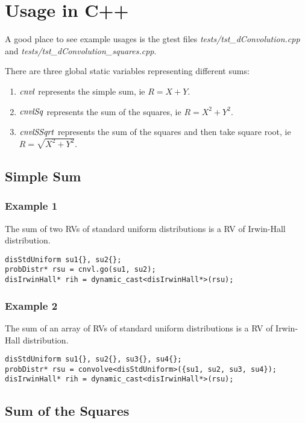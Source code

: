 \section{Usage in C++}

A good place to see example usages is the gtest files \textit{tests/tst\_dConvolution.cpp} \\
and \textit{tests/tst\_dConvolution\_squares.cpp}.

There are three global static variables representing different sums:
\begin{enumerate}
    \item \(\it{cnvl}\) represents the simple sum, ie $R=X+Y$.
    \item \(\it{cnvlSq}\) represents the sum of the squares, ie $R=X^2+Y^2$.
    \item \(\it{cnvlSSqrt}\) represents the sum of the squares and then take square root, ie $R=\sqrt{X^2+Y^2}$.
\end{enumerate}


\subsection{Simple Sum}

\subsubsection*{Example 1}
The sum of two RVs of standard uniform distributions is a RV of Irwin-Hall distribution.

\begin{verbatim}
disStdUniform su1{}, su2{};
probDistr* rsu = cnvl.go(su1, su2);
disIrwinHall* rih = dynamic_cast<disIrwinHall*>(rsu);
\end{verbatim}

\subsubsection*{Example 2}
The sum of an array of RVs of standard uniform distributions is a RV of Irwin-Hall distribution.

\begin{verbatim}
disStdUniform su1{}, su2{}, su3{}, su4{};
probDistr* rsu = convolve<disStdUniform>({su1, su2, su3, su4});
disIrwinHall* rih = dynamic_cast<disIrwinHall*>(rsu);
\end{verbatim}


\subsection{Sum of the Squares}

